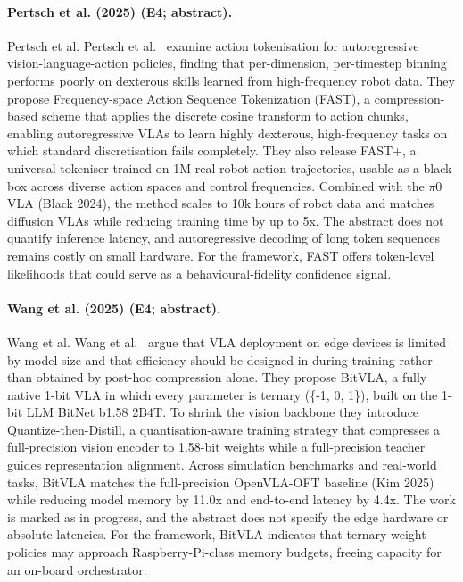\documentclass[10pt,a4paper]{article}
\begin{document}
\paragraph{Pertsch et al. (2025) (E4; abstract).} Pertsch et al. Pertsch et al.~\cite{Pertsch2025} examine action tokenisation for autoregressive vision-language-action policies, finding that per-dimension, per-timestep binning performs poorly on dexterous skills learned from high-frequency robot data. They propose Frequency-space Action Sequence Tokenization (FAST), a compression-based scheme that applies the discrete cosine transform to action chunks, enabling autoregressive VLAs to learn highly dexterous, high-frequency tasks on which standard discretisation fails completely. They also release FAST+, a universal tokeniser trained on 1M real robot action trajectories, usable as a black box across diverse action spaces and control frequencies. Combined with the $\pi$0 VLA (Black 2024), the method scales to 10k hours of robot data and matches diffusion VLAs while reducing training time by up to 5x. The abstract does not quantify inference latency, and autoregressive decoding of long token sequences remains costly on small hardware. For the framework, FAST offers token-level likelihoods that could serve as a behavioural-fidelity confidence signal.

\paragraph{Wang et al. (2025) (E4; abstract).} Wang et al. Wang et al.~\cite{Wang2025a} argue that VLA deployment on edge devices is limited by model size and that efficiency should be designed in during training rather than obtained by post-hoc compression alone. They propose BitVLA, a fully native 1-bit VLA in which every parameter is ternary (\{-1, 0, 1\}), built on the 1-bit LLM BitNet b1.58 2B4T. To shrink the vision backbone they introduce Quantize-then-Distill, a quantisation-aware training strategy that compresses a full-precision vision encoder to 1.58-bit weights while a full-precision teacher guides representation alignment. Across simulation benchmarks and real-world tasks, BitVLA matches the full-precision OpenVLA-OFT baseline (Kim 2025) while reducing model memory by 11.0x and end-to-end latency by 4.4x. The work is marked as in progress, and the abstract does not specify the edge hardware or absolute latencies. For the framework, BitVLA indicates that ternary-weight policies may approach Raspberry-Pi-class memory budgets, freeing capacity for an on-board orchestrator.
\end{document}
